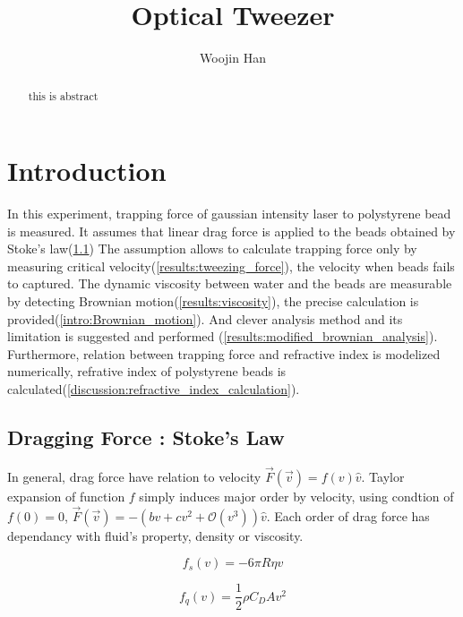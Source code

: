 \documentclass{article}
\begin{document}
\title{Optical Tweezer}
\author[a]{Woojin Han}
\maketitle
\begin{abstract}
    this is abstract
\end{abstract}

\section{Introduction}
\label{sec:intro}
In this experiment, trapping force of gaussian intensity laser to polystyrene bead is measured.
It assumes that linear drag force is applied to the beads obtained by Stoke's law(\ref{intro:Stokes_law})
The assumption allows to calculate trapping force only by measuring critical velocity(\ref{results:tweezing_force}), the velocity when beads fails to captured.
The dynamic viscosity between water and the beads are measurable by detecting Brownian motion(\ref{results:viscosity}), the precise calculation is provided(\ref{intro:Brownian_motion}).
And clever analysis method and its limitation is suggested and performed (\ref{results:modified_brownian_analysis}).
Furthermore, relation between trapping force and refractive index is modelized numerically, refrative index of polystyrene beads is calculated(\ref{discussion:refractive_index_calculation}).


\subsection{Dragging Force : Stoke's Law}
\label{intro:Stokes_law}

In general, drag force have relation to velocity $\vec{F}(\vec{v})=f(v) \hat{v}$.
Taylor expansion of function $f$ simply induces major order by velocity, using condtion of $f(0)=0$, $\vec{F}(\vec{v})=-(bv+cv^2+\mathcal{O}(v^3))\hat{v}$.
Each order of drag force has dependancy with fluid's property, density or viscosity.

\begin{equation}
    f_s(v) = -6 \pi R \eta v
\label{equation:Stokes_law}
\end{equation}

\begin{equation}
    f_q(v) = \frac{1}{2} \rho C_D A v^2
\label{equation:quadratic_drag}
\end{equation}
\end{document}
